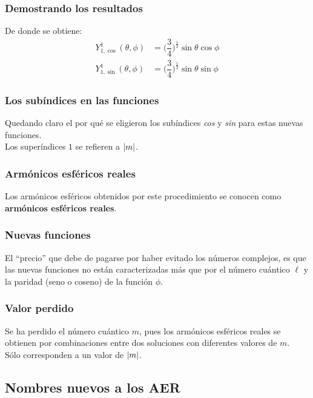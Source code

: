 \documentclass[12pt]{beamer}
\begin{document}
\begin{frame}
\frametitle{Demostrando los resultados}
De donde se obtiene:
\pause
\begin{align}
Y_{1, \cos}^{1} (\theta, \phi) &= \bigg( \dfrac{3}{4} \bigg)^{\frac{1}{2}} \sin \theta \cos \phi \label{eq:ecuacion_07_88} \\[0.5em]
Y_{1, \sin}^{1} (\theta, \phi) &= \bigg( \dfrac{3}{4} \bigg)^{\frac{1}{2}} \sin \theta \sin \phi \label{eq:ecuacion_07_89}
\end{align}
\end{frame}
\begin{frame}
\frametitle{Los subíndices en las funciones}
Quedando claro el por qué se eligieron los subíndices \emph{cos} y \emph{sin} para estas nuevas funciones.
\\
\bigskip
\pause
Los superíndices $1$ se refieren a $\abs{m}$.
\end{frame}
\begin{frame}
\frametitle{Armónicos esféricos reales}
Los armónicos esféricos obtenidos por este procedimiento se conocen como \textbf{\textcolor{cordovan}{armónicos esféricos reales}}.
\end{frame}
\begin{frame}
\frametitle{Nuevas funciones}
El \enquote{precio} que debe de pagarse por haber evitado los números complejos, \pause es que las nuevas funciones no están caracterizadas más que por el número cuántico $\ell$ y la paridad (seno o coseno) de la función $\phi$.
\end{frame}
\begin{frame}
\frametitle{Valor perdido}
Se ha perdido el número cuántico $m$, pues los armónicos esféricos reales se obtienen por combinaciones entre dos soluciones con diferentes valores de $m$.
\\
\bigskip
\pause
Sólo corresponden a un valor de $\abs{m}$.
\end{frame}

\subsection{Nombres nuevos a los AER}
\end{document}
